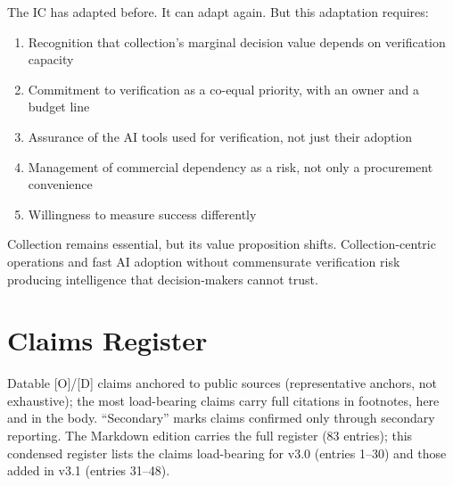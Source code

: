 \documentclass[11pt,letterpaper]{article}
\begin{document}
\begin{keybox}
The IC has adapted before. It can adapt again. But this adaptation requires:
\begin{enumerate}[nosep]
  \item Recognition that collection's marginal decision value depends on verification capacity
  \item Commitment to verification as a co-equal priority, with an owner and a budget line
  \item Assurance of the AI tools used for verification, not just their adoption
  \item Management of commercial dependency as a risk, not only a procurement convenience
  \item Willingness to measure success differently
\end{enumerate}
Collection remains essential, but its value proposition shifts. Collection-centric operations and fast AI adoption without commensurate verification risk producing intelligence that decision-makers cannot trust.
\end{keybox}

\appendix
\sloppy

\section{Claims Register}

Datable [O]/[D] claims anchored to public sources (representative anchors, not exhaustive); the most load-bearing claims carry full citations in footnotes, here and in the body. ``Secondary'' marks claims confirmed only through secondary reporting. The Markdown edition carries the full register (83 entries); this condensed register lists the claims load-bearing for v3.0 (entries 1--30) and those added in v3.1 (entries 31--48).
\end{document}
